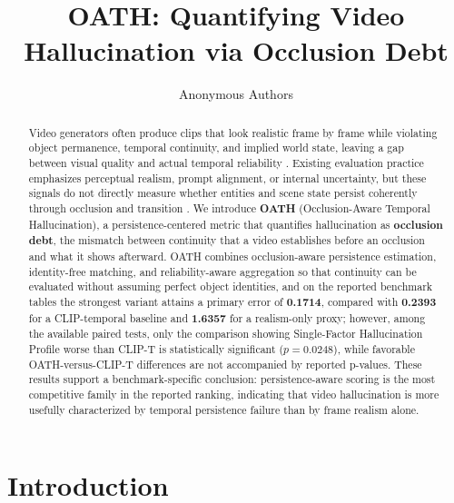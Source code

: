 \documentclass{article}
\title{OATH: Quantifying Video Hallucination via Occlusion Debt}
\author{Anonymous Authors}
\begin{document}
\maketitle

\begin{abstract}
Video generators often produce clips that look realistic frame by frame while violating object permanence, temporal continuity, and implied world state, leaving a gap between visual quality and actual temporal reliability \cite{vbench2024,fvd2018,clipscore2021,tifa2023}. Existing evaluation practice emphasizes perceptual realism, prompt alignment, or internal uncertainty, but these signals do not directly measure whether entities and scene state persist coherently through occlusion and transition \cite{vbench2024,t2vcompbench2024,dreamdojo2026,fideseq2024}. We introduce \textbf{OATH} (Occlusion-Aware Temporal Hallucination), a persistence-centered metric that quantifies hallucination as \textbf{occlusion debt}, the mismatch between continuity that a video establishes before an occlusion and what it shows afterward. OATH combines occlusion-aware persistence estimation, identity-free matching, and reliability-aware aggregation so that continuity can be evaluated without assuming perfect object identities, and on the reported benchmark tables the strongest variant attains a primary error of \textbf{0.1714}, compared with \textbf{0.2393} for a CLIP-temporal baseline and \textbf{1.6357} for a realism-only proxy; however, among the available paired tests, only the comparison showing Single-Factor Hallucination Profile worse than CLIP-T is statistically significant (\(p=0.0248\)), while favorable OATH-versus-CLIP-T differences are not accompanied by reported p-values. These results support a benchmark-specific conclusion: persistence-aware scoring is the most competitive family in the reported ranking, indicating that video hallucination is more usefully characterized by temporal persistence failure than by frame realism alone.
\end{abstract}

\section{Introduction}
\end{document}
